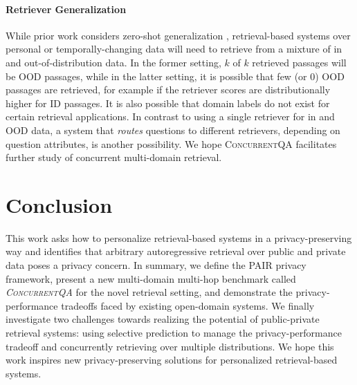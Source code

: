 \documentclass{article}
\renewcommand\cite{\citep}	\newcommand\shortcite{\citeyearpar}\newcommand\newcite{\citet}
\newcommand{\datasetname}{\textsc{ConcurrentQA}\xspace}
\newcommand{\problemshortname}{\textsc{PAIR}\xspace}
\begin{document}
\paragraph{Retriever Generalization} While prior work considers zero-shot generalization \cite{thakur2021beir, guoa2021multireqa}, retrieval-based systems over personal or temporally-changing data will need to retrieve from a mixture of in and out-of-distribution  data. In the former setting, $k$ of $k$ retrieved passages will be OOD passages, while in the latter setting, it is possible that few (or $0$) OOD passages are retrieved, for example if the retriever scores are distributionally higher for ID passages. It is also possible that domain labels do not exist for certain retrieval applications. In contrast to using a single retriever for in and OOD data, a system that \textit{routes} questions to different retrievers, depending on question attributes, is another possibility. We hope \datasetname facilitates further study of concurrent multi-domain retrieval. 

 
\section{Conclusion}
This work asks how to personalize retrieval-based systems in a privacy-preserving way and identifies that arbitrary autoregressive retrieval over public and private data poses a privacy concern. In summary, we define the \problemshortname privacy framework, present a new multi-domain multi-hop benchmark called \textit{\datasetname} for the novel retrieval setting, and demonstrate the privacy-performance tradeoffs faced by existing open-domain systems. We finally investigate two challenges towards realizing the potential of public-private retrieval systems: using selective prediction to manage the privacy-performance tradeoff and concurrently retrieving over multiple distributions. We hope this work inspires new privacy-preserving solutions for personalized retrieval-based systems. 
\end{document}
